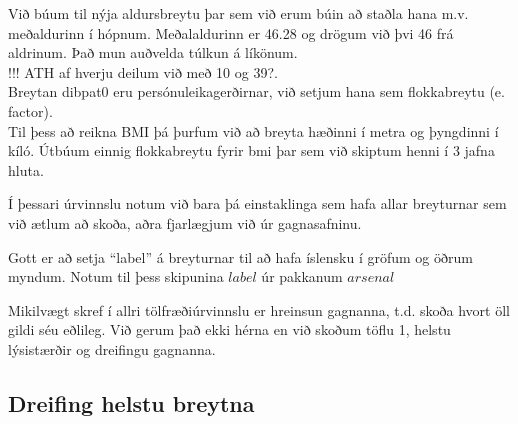 \documentclass[
]{book}
\newenvironment{Shaded}{\begin{snugshade}}{\end{snugshade}}
\newcommand{\CommentTok}[1]{\textcolor[rgb]{0.56,0.35,0.01}{\textit{#1}}}
\newcommand{\KeywordTok}[1]{\textcolor[rgb]{0.13,0.29,0.53}{\textbf{#1}}}
\newcommand{\NormalTok}[1]{#1}
\newcommand{\OperatorTok}[1]{\textcolor[rgb]{0.81,0.36,0.00}{\textbf{#1}}}
\newcommand{\StringTok}[1]{\textcolor[rgb]{0.31,0.60,0.02}{#1}}
\begin{document}
Við búum til nýja aldursbreytu þar sem við erum búin að staðla hana m.v. meðaldurinn í hópnum. Meðalaldurinn er 46.28 og drögum við þvi 46 frá aldrinum. Það mun auðvelda túlkun á líkönum.\\
!!! ATH af hverju deilum við með 10 og 39?.\\
Breytan dibpat0 eru persónuleikagerðirnar, við setjum hana sem flokkabreytu (e. factor).\\
Til þess að reikna BMI þá þurfum við að breyta hæðinni í metra og þyngdinni í kíló. Útbúum einnig flokkabreytu fyrir bmi þar sem við skiptum henni í 3 jafna hluta.

Í þessari úrvinnslu notum við bara þá einstaklinga sem hafa allar breyturnar sem við ætlum að skoða, aðra fjarlægjum við úr gagnasafninu.

Gott er að setja ``label'' á breyturnar til að hafa íslensku í gröfum og öðrum myndum. Notum til þess skipunina \(label\) úr pakkanum \(arsenal\)

\begin{Shaded}
\end{Shaded}

Mikilvægt skref í allri tölfræðiúrvinnslu er hreinsun gagnanna, t.d. skoða hvort öll gildi séu eðlileg. Við gerum það ekki hérna en við skoðum töflu 1, helstu lýsistærðir og dreifingu gagnanna.

\hypertarget{dreifing-helstu-breytna}{%
\subsection{Dreifing helstu breytna}\label{dreifing-helstu-breytna}}
\end{document}
